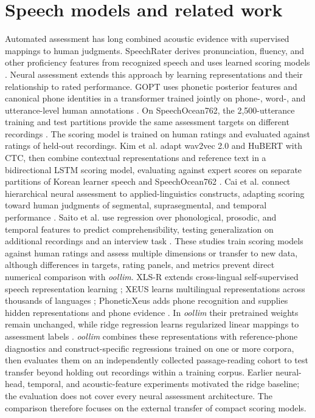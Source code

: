 \documentclass[10pt]{article}
\begin{document}
\section{Speech models and related work}
Automated assessment has long combined acoustic evidence with supervised mappings to human judgments. SpeechRater derives pronunciation, fluency, and other proficiency features from recognized speech and uses learned scoring models \cite{speechrater}. Neural assessment extends this approach by learning representations and their relationship to rated performance. GOPT uses phonetic posterior features and canonical phone identities in a transformer trained jointly on phone-, word-, and utterance-level human annotations \cite{gopt}. On SpeechOcean762, the 2,500-utterance training and test partitions provide the same assessment targets on different recordings \cite{speechocean,gopt}. The scoring model is trained on human ratings and evaluated against ratings of held-out recordings. Kim et al. adapt wav2vec 2.0 and HuBERT with CTC, then combine contextual representations and reference text in a bidirectional LSTM scoring model, evaluating against expert scores on separate partitions of Korean learner speech and SpeechOcean762 \cite{kim}. Cai et al. connect hierarchical neural assessment to applied-linguistics constructs, adapting scoring toward human judgments of segmental, suprasegmental, and temporal performance \cite{cai}. Saito et al. use regression over phonological, prosodic, and temporal features to predict comprehensibility, testing generalization on additional recordings and an interview task \cite{saito}. These studies train scoring models against human ratings and assess multiple dimensions or transfer to new data, although differences in targets, rating panels, and metrics prevent direct numerical comparison with \textit{oollim}. XLS-R extends cross-lingual self-supervised speech representation learning \cite{xlsr}; XEUS learns multilingual representations across thousands of languages \cite{xeus}; PhoneticXeus adds phone recognition and supplies hidden representations and phone evidence \cite{phonetic}. In \textit{oollim} their pretrained weights remain unchanged, while ridge regression learns regularized linear mappings to assessment labels \cite{ridge}. \textit{oollim} combines these representations with reference-phone diagnostics and construct-specific regressions trained on one or more corpora, then evaluates them on an independently collected passage-reading cohort to test transfer beyond holding out recordings within a training corpus. Earlier neural-head, temporal, and acoustic-feature experiments motivated the ridge baseline; the evaluation does not cover every neural assessment architecture. The comparison therefore focuses on the external transfer of compact scoring models.
\end{document}
